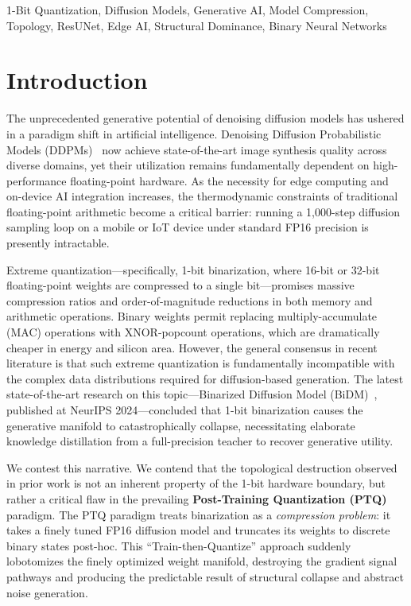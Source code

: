 \documentclass[conference]{IEEEtran}
\begin{document}
\begin{IEEEkeywords}
1-Bit Quantization, Diffusion Models, Generative AI, Model Compression, Topology,
ResUNet, Edge AI, Structural Dominance, Binary Neural Networks
\end{IEEEkeywords}

\section{Introduction}

The unprecedented generative potential of denoising diffusion models has ushered in a
paradigm shift in artificial intelligence. Denoising Diffusion Probabilistic Models
(DDPMs)~\cite{ho2020ddpm} now achieve state-of-the-art image synthesis quality across
diverse domains, yet their utilization remains fundamentally dependent on
high-performance floating-point hardware. As the necessity for edge computing and
on-device AI integration increases, the thermodynamic constraints of traditional
floating-point arithmetic become a critical barrier: running a 1{,}000-step diffusion
sampling loop on a mobile or IoT device under standard FP16 precision is presently
intractable.

Extreme quantization---specifically, 1-bit binarization, where 16-bit or 32-bit
floating-point weights are compressed to a single bit---promises massive compression
ratios and order-of-magnitude reductions in both memory and arithmetic operations. Binary
weights permit replacing multiply-accumulate (MAC) operations with XNOR-popcount
operations, which are dramatically cheaper in energy and silicon area. However, the
general consensus in recent literature is that such extreme quantization is fundamentally
incompatible with the complex data distributions required for diffusion-based generation.
The latest state-of-the-art research on this topic---Binarized Diffusion Model
(BiDM)~\cite{bidm2024}, published at NeurIPS 2024---concluded that 1-bit binarization
causes the generative manifold to catastrophically collapse, necessitating elaborate
knowledge distillation from a full-precision teacher to recover generative utility.

We contest this narrative. We contend that the topological destruction observed in prior
work is not an inherent property of the 1-bit hardware boundary, but rather a critical
flaw in the prevailing \textbf{Post-Training Quantization (PTQ)} paradigm. The PTQ
paradigm treats binarization as a \emph{compression problem}: it takes a finely tuned
FP16 diffusion model and truncates its weights to discrete binary states post-hoc. This
``Train-then-Quantize'' approach suddenly lobotomizes the finely optimized weight
manifold, destroying the gradient signal pathways and producing the predictable result of
structural collapse and abstract noise generation.
\end{document}
